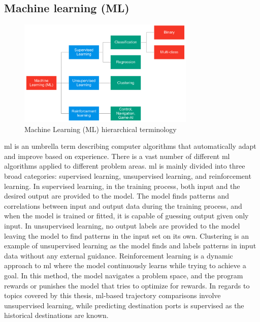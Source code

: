 \subsection{Machine learning (ML)}
\label{sec:machine_learning}

\begin{figure}[htbp]  %
    \centering
    \includegraphics[width=0.75\textwidth]{figures/ml-terms}
    \caption{Machine Learning (ML) hierarchical terminology}
    \label{fig:ml_terms}
\end{figure}

\acrfull{ml} is an umbrella term describing computer algorithms that automatically adapt and improve based on experience. There is a vast number of different \acrshort{ml} algorithms applied to different problem areas. \acrshort{ml} is mainly divided into three broad categories: supervised learning, unsupervised learning, and reinforcement learning. In supervised learning, in the training process, both input and the desired output are provided to the model. The model finds patterns and correlations between input and output data during the training process, and when the model is trained or fitted, it is capable of guessing output given only input. In unsupervised learning, no output labels are provided to the model leaving the model to find patterns in the input set on its own. Clustering is an example of unsupervised learning as the model finds and labels patterns in input data without any external guidance. Reinforcement learning is a dynamic approach to \acrshort{ml} where the model continuously learns while trying to achieve a goal. In this method, the model navigates a problem space, and the program rewards or punishes the model that tries to optimize for rewards. In regards to topics covered by this thesis, \acrshort{ml}-based trajectory comparisons involve unsupervised learning, while predicting destination ports is supervised as the historical destinations are known.

